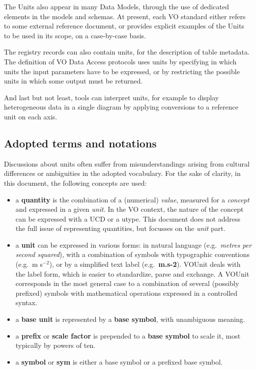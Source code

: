 \documentclass[11pt,notitlepage,onecolumn]{ivoa}
\def\eg{e.g.~}
\newcommand{\unit}[1]{\textbf{\textsf{\color{orange}#1}}}
\begin{document}
The Units also appear in many Data Models, through the use of dedicated elements in
the models and schemas.
At present, each VO standard either refers to some external reference document, or 
provides explicit examples of the Units to be used in its scope, on a case-by-case
basis.

The registry records can also contain units, for the description of table metadata.
The definition of VO Data Access protocols uses units by specifying in which units the input
parameters have to be expressed, or by restricting the possible units in which some 
output must be returned.

And last but not least, tools can interpret units, for example to display
heterogeneous data in a single diagram by applying conversions to a reference 
unit on each axis.

\subsection{Adopted terms and notations\label{sec:notations}}

Discussions about units often suffer from misunderstandings arising from cultural
differences or ambiguities in the adopted vocabulary. For the sake of clarity, in this 
document, the following concepts are used:

\begin{itemize}
\item a \textbf{quantity} is the combination of a (numerical) {\em value}, measured for a {\em concept} and expressed in a given {\em unit}. 
In the VO context, the nature of the concept can be expressed with a UCD or a utype. This document does not address the full issue of
representing quantities, but focusses on the {\em unit} part.
\item a \textbf{unit} can be expressed in various forms: in natural language (\eg \emph{metres per second squared}), with a combination
of symbols with typographic conventions (\eg m s$^{-2}$), or by a simplified text label (\eg \unit{m.s-2}). VOUnit deals with the
label form, which is easier to standardize, parse and exchange. A VOUnit corresponds in the most general case to a combination of
several (possibly prefixed) symbols with mathematical operations expressed in a controlled syntax.
\item a \textbf{base unit} is represented by a \textbf{base symbol}, with unambiguous meaning.
\item a \textbf{prefix} or \textbf{scale factor} is prepended to a
\textbf{base symbol} to scale it, most typically by powers of ten.
\item a \textbf{symbol} or \unit{sym} is either a base symbol or a prefixed base symbol.
\end{itemize}
\end{document}
